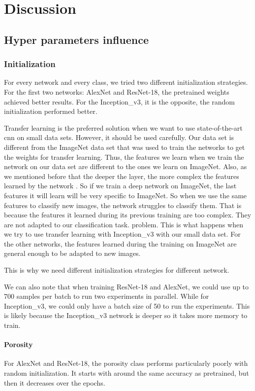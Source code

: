 \chapter{Discussion}\label{chp:discussion}
\section{Hyper parameters influence}
\subsection{Initialization}

For every network and every class, we tried two different initialization strategies. For the first two networks: AlexNet and ResNet-18, the pretrained weights achieved better results. For the Inception\_v3, it is the opposite, the random initialization performed better. 

Transfer learning is the preferred solution when we want to use state-of-the-art \gls{cnn} on small data sets. However, it should be used carefully. 
Our data set is different from the ImageNet data set that was used to train the networks to get the weights for transfer learning. Thus, the features  we learn when we train the network on our data set are different to the ones we learn on ImageNet.
 Also, as we mentioned before that the deeper the layer, the more complex the features learned by the network \cite{layerslearn}. So if we train a deep network on ImageNet, the last features it will learn will be very specific to ImageNet. So when  we use the same features to classify new images, the network struggles to classify them. 
 That is because the features it learned during its previous training are too complex. They are not adapted to our classification task. problem. This is what happens when we try to use transfer learning with Inception\_v3 with our small data set. 
For the other networks, the features learned during the training on ImageNet are general enough to be adapted to new images.

This is why we need different initialization strategies for different network.

We can also note that when training ResNet-18 and AlexNet, we could use up to 700 samples per batch to run two experiments in parallel. While for Inception\_v3, we could only have a batch size of 50 to run the experiments. This is likely because the Inception\_v3  network is deeper so it takes more memory to train.


\subsubsection{Porosity}
For AlexNet and ResNet-18, the porosity class performs particularly poorly with random initialization. It starts with around the same accuracy as pretrained, but then it decreases over the \gls{epochs}. 

